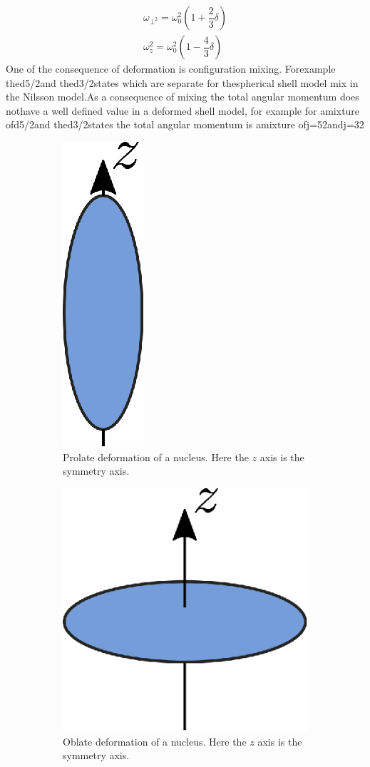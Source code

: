 \documentclass[10pt,a4paper, twoside, openright]{report}
\begin{document}
\begin{align*}
\omega_{\perp^{2}} = \omega_0^2\left(1 + \dfrac{2}{3}\delta\right) \\
\omega_z^2 = \omega_0^2\left(1 - \dfrac{4}{3}\delta\right)
\end{align*}
One of the consequence of deformation is configuration mixing.  Forexample thed5/2and thed3/2states which are separate for thespherical shell model mix in the Nilsson model.As a consequence of mixing the total angular momentum does nothave a well defined value in a deformed shell model, for example for amixture ofd5/2and thed3/2states the total angular momentum is amixture ofj=52andj=32
\begin{figure}
\centering
\begin{subfigure}[b]{0.48\textwidth}
\centering
\includegraphics{./figures/prolate.eps}
\caption{Prolate deformation of a nucleus. Here the $z$ axis is the symmetry axis.}
\end{subfigure}	
\quad
\begin{subfigure}[b]{0.48\textwidth}
\centering
\includegraphics{./figures/oblate.eps}
\caption{Oblate deformation of a nucleus. Here the $z$ axis is the symmetry axis.}
\end{subfigure}
\caption[Quadrupole deformations of nuclei]{ }
\end{figure}
\end{document}
